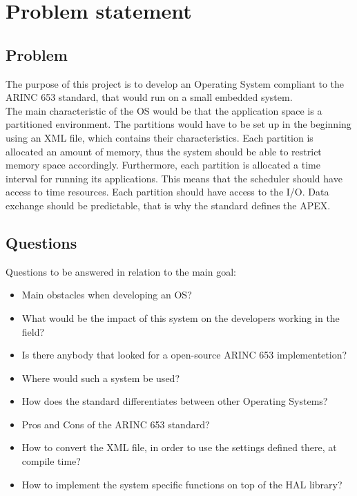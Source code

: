 \chapter{Problem statement}

\section{Problem}

The purpose of this project is to develop an Operating System compliant to the ARINC 653 standard, that would run on a small embedded system. \\

The main characteristic of the OS would be that the application space is a partitioned environment.
The partitions would have to be set up in the beginning using an XML file, which contains their 
characteristics.
Each partition is allocated an amount of memory, thus the system should be able to restrict memory 
space accordingly.
Furthermore, each partition is allocated a time interval for running its applications. This means
that the scheduler should have access to time resources. 
Each partition should have access to the I/O.
Data exchange should be predictable, that is why the standard defines the APEX. 

\section{Questions}


Questions to be answered in relation to the main goal:\\
\begin{itemize}

	\item Main obstacles when developing an OS?
	\item What would be the impact of this system on the developers working in the field?
	\item Is there anybody that looked for a open-source ARINC 653 implementetion?
	\item Where would such a system be used?
	\item How does the standard differentiates between other Operating Systems?
	\item Pros and Cons of the ARINC 653 standard?
	\item How to convert the XML file, in order to use the settings defined there, at compile time?
	\item How to implement the system specific functions on top of the HAL library?

\end{itemize}